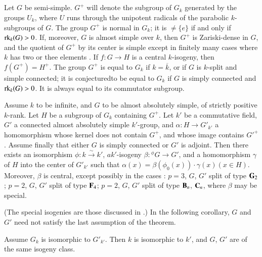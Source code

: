 \subsection{}\label{art05-sec1.1}
Let $G$ be semi-simple. $G^{+}$ will denote the subgroup of $G_{k}$ generated by the groups $U_{k}$, where $U$ runs through the unipotent radicals of the parabolic $k$-subgroups of $G$. The group $G^{+}$ is normal in $G_{k}$; it is $\neq \{e\}$ if and only if $\operatorname{\mathrm{rk}}_{k}(G)>0$. If, moreover, $G$ is almost simple over $k$, then $G^{+}$ is Zariski-dense in $G$, and the quotient of $G^{+}$ by its center is simple except in finitely many cases where $k$ has two or thee elements \cite{art05-key10}. If $f:G\to H$ is a central $k$-isogeny, then $f(G^{+})=H^{+}$. The group $G^{+}$ is equal to $G_{k}$ if $k=\overline{k}$, or if $G$ is $k$-split and simple connected; it is conjectured\pageoriginale to be equal to $G_{k}$ if $G$ is simply connected and $\operatorname{\mathrm{rk}}_{k}(G)>0$\cite{art05-key10}. It is always equal to its commutator subgroup.

\setcounter{theorem}{1}
\begin{theorem}\label{art05-thm1.2}
Assume $k$ to be infinite, and $G$ to be almost absolutely simple, of strictly positive $k$-rank. Let $H$ be a subgroup of $G_{k}$ containing $G^{+}$. Let $k'$ be a commutative field, $G'$ a connected almost absolutely simple $k'$-group, and $\alpha:H\to G'_{k'}$ a homomorphism whose kernel does not contain $G^{+}$, and whose image contains ${G'}^{+}$. Assume finally that either $G$ is simply connected or $G'$ is adjoint. Then there exists an isomorphism $\phi:k\xrightarrow{\sim}k'$, $ak'$-isogeny $\beta:{}^{\phi}G\to G'$, and a homomorphism $\gamma$ of $H$ into the center of $G'_{k'}$ such that $\alpha(x)=\beta(\phi_{0}(x))\cdot \gamma(x)(x\in H)$. Moreover, $\beta$ is central, except possibly in the cases : $p=3$, $G$, $G'$ split of type $\mathbf{G}_{2}$; $p=2$, $G$, $G'$ split of type $\mathbf{F}_{4}$; $p=2$, $G$, $G'$ split of type $\mathbf{B}_{n}$, $\mathbf{C}_{n}$, where $\beta$ may be special.
\end{theorem}

(The special isogenies are those discussed in \cite[Exp. 21-24]{art05-key3}.) In the following corollary, $G$ and $G'$ need not satisfy the last assumption of the theorem.

\begin{corollary}\label{art05-coro1.3}
Assume $G_{k}$ is isomorphic to $G'_{k'}$. Then $k$ is isomorphic to $k'$, and $G$, $G'$ are of the same isogeny class.
\end{corollary}

